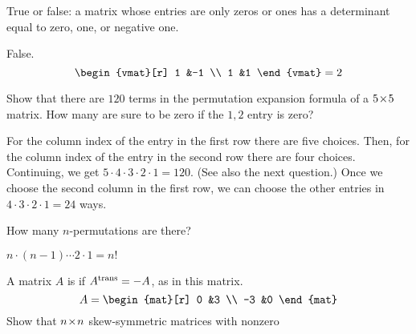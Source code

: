 \begin{exercises}
\begin{answer}
    \end{answer}
  \item 
    \cite{Strang}
    True or false: a matrix whose entries are only zeros
    or ones has a determinant equal to zero, one, or negative one.
    \begin{answer}
      False.
      \begin{equation*}
        \begin{vmat}[r]
          1  &-1  \\
          1  &1
        \end{vmat}
        =2
      \end{equation*} 
     \end{answer}
  \item 
    \begin{exparts}
      \partsitem Show that there are $120$ terms in the permutation
         expansion formula of a \( 5 \! \times \! 5 \) matrix.
      \partsitem 
         How many are sure to be zero if the \( 1,2 \) entry is zero?
    \end{exparts}
    \begin{answer}
      \begin{exparts}
        \partsitem For the column index of the entry in the first row there are
          five choices.
          Then, for the column index of the entry in the second row there
          are four choices.
          Continuing, we get $5\cdot 4\cdot 3\cdot 2\cdot 1=120$.
          (See also the next question.)
        \partsitem Once we choose the second column in the first row, 
          we can choose the other entries in \( 4\cdot 3\cdot 2\cdot 1=24 \) 
          ways.
      \end{exparts}  
    \end{answer}
  \item 
    How many \( n \)-permutations are there?
    \begin{answer}
       \( n\cdot(n-1)\cdots 2\cdot 1=n! \) 
    \end{answer}
  \item 
    A matrix \( A \) is 
     if \( {{A}^{\rm trans}}=-A \),
    as in this matrix.
    \begin{equation*}
      A=\begin{mat}[r]
          0  &3  \\
         -3  &0
        \end{mat}
    \end{equation*}
    Show that \( n \! \times \! n \) skew-symmetric matrices with nonzero

\end{exercises}
